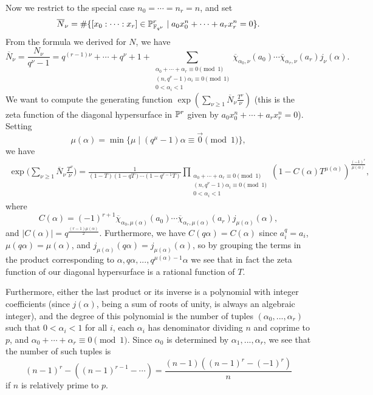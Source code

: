 Now we restrict to the special case $n_0 = \cdots = n_r = n$, and set
\[
\overline{N}_\nu = \#\{[x_0:\cdots :x_r]\in\mathbb{P}_{\mathbb{F}_{q^\nu}}^r \mid a_0x_0^n + \cdots + a_rx_r^n = 0\}.
\]
From the formula we derived for $N$, we have
\[
\overline{N}_\nu = \frac{N_\nu}{q^\nu-1} = q^{(r-1)\nu} + \cdots + q^\nu + 1 + \sum_{\substack{\alpha_0+\cdots+\alpha_r \equiv 0 \pmod{1}\\(n,q^{\nu}-1)\alpha_i \equiv 0 \pmod{1}\\0 < \alpha_i < 1}} \overline{\chi}_{\alpha_0,\nu}(a_0)\cdots\overline{\chi}_{\alpha_r,\nu}(a_r)j_\nu(\alpha).
\]
We want to compute the generating function $\exp(\sum_{\nu\ge 1} \overline{N}_\nu \frac{T^\nu}{\nu})$ (this is the zeta function of the diagonal hypersurface in $\mathbb{P}^r$ given by $a_0x_0^n + \cdots + a_rx_r^n = 0$). Setting
\[
\mu(\alpha) = \min \{\mu \mid (q^\mu - 1)\alpha \equiv \vec{0} \pmod{1}\},
\]
we have
\begin{align*}
\exp\bigg(\sum_{\nu\ge 1} \overline{N}_\nu \frac{T^\nu}{\nu}\bigg) = \frac{1}{(1-T)(1-qT)\cdots (1-q^{r-1}T)}\prod_{\substack{\alpha_0+\cdots+\alpha_r \equiv 0 \pmod{1}\\(n,q^{\nu}-1)\alpha_i \equiv 0 \pmod{1}\\0 < \alpha_i < 1}}(1-C(\alpha)T^{\mu(\alpha)})^{\frac{(-1)^r}{\mu(\alpha)}},
\end{align*}
where
\[
C(\alpha) = (-1)^{r+1}\overline{\chi}_{\alpha_0,\mu(\alpha)}(a_0)\cdots\overline{\chi}_{\alpha_r,\mu(\alpha)}(a_r)j_{\mu(\alpha)}(\alpha),
\]
and $|C(\alpha)| = q^{\frac{(r-1)\mu(\alpha)}{2}}$. Furthermore, we have $C(q\alpha) = C(\alpha)$ since $a_i^q = a_i$, $\mu(q\alpha) = \mu(\alpha)$, and $j_{\mu(\alpha)}(q\alpha) = j_{\mu(\alpha)}(\alpha)$, so by grouping the terms in the product corresponding to $\alpha, q\alpha, ..., q^{\mu(\alpha)-1}\alpha$ we see that in fact the zeta function of our diagonal hypersurface is a rational function of $T$.

Furthermore, either the last product or its inverse is a polynomial with integer coefficients (since $j(\alpha)$, being a sum of roots of unity, is always an algebraic integer), and the degree of this polynomial is the number of tuples $(\alpha_0, ..., \alpha_r)$ such that $0 < \alpha_i < 1$ for all $i$, each $\alpha_i$ has denominator dividing $n$ and coprime to $p$, and $\alpha_0 + \cdots + \alpha_r \equiv 0 \pmod{1}$. Since $\alpha_0$ is determined by $\alpha_1, ..., \alpha_r$, we see that the number of such tuples is
\[
(n-1)^r - ((n-1)^{r-1} - \cdots) = \frac{(n-1)((n-1)^r-(-1)^r)}{n}
\]
if $n$ is relatively prime to $p$.

